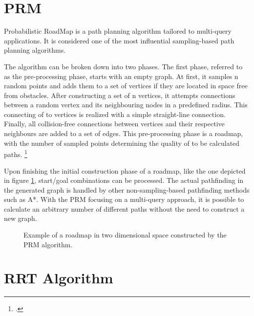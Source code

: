 \section{PRM}

Probabilistic RoadMap is a path planning algorithm tailored to multi-query applications. It is considered one of the most influential sampling-based path planning algorithms. 

The algorithm can be broken down into two phases. The first phase, referred to as the pre-processing phase, starts with an empty graph. At first, it samples n random points and adds them to a set of vertices if they are located in space free from obstacles. After constructing a set of n vertices, it attempts connections between a random vertex and its neighbouring nodes in a predefined radius. This connecting of to vertices is realized with a simple straight-line connection. Finally, all collision-free connections between vertices and their respective neighbours are added to a set of edges. This pre-processing phase is a roadmap, with the number of sampled points determining the quality of to be calculated paths. 
\footcite{Karaman2011}

Upon finishing the initial construction phase of a roadmap, like the one depicted in figure \ref{fig:path_planning_prm}, start/goal combinations can be processed. 
The actual pathfinding in the generated graph is handled by other non-sampling-based pathfinding methods such as A*.\newline
With the PRM focusing on a multi-query approach, it is possible to calculate an arbitrary number of different paths without the need to construct a new graph.

\begin{figure}[h]
	\centering
	
	\caption{Example of a roadmap in two dimensional space constructed by the PRM algorithm.}
	\label{fig:path_planning_prm}
\end{figure}

\section{RRT Algorithm}

